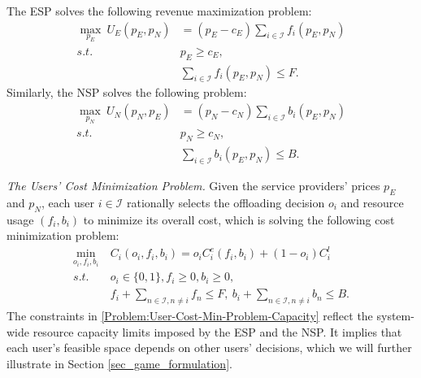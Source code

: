 \documentclass[lettersize,journal]{IEEEtran}
\begin{document}
The ESP solves the following revenue maximization problem:
\begin{subequations}
\label{Problem:ESP}
\begin{align}
    \max_{p_E}\ U_E(p_E,p_N)&=(p_E-c_E)\sum_{i\in\mathcal{I}}f_i(p_E,p_N)\\
    s.t.\ &p_E\ge c_E,\\
    &\sum_{i\in\mathcal{I}}f_i(p_E,p_N)\le F.\label{Problem:ESP-capacity}
\end{align}
\end{subequations}
 Similarly, the NSP solves the following problem:
\begin{subequations}
\label{Problem:NSP}
    \begin{align}
        \max_{p_N}\ U_N(p_N,p_E)&=(p_N-c_N)\sum_{i\in\mathcal{I}}b_i(p_E,p_N)\\
        s.t.\ &p_N\ge c_N,\\
        &\sum_{i\in\mathcal{I}}b_i(p_E,p_N)\le B.\label{Problem:NSP-capacity}
    \end{align}
\end{subequations}


\emph{The Users' Cost Minimization Problem.}
Given the service providers' prices $p_E$ and $p_N$, each user $i\in\mathcal{I}$ rationally selects the offloading decision $o_i$ and resource usage $(f_i,b_i)$ to minimize its overall cost, which is solving the following cost minimization problem:
\begin{subequations}
    \label{Problem:User-Cost-Min-Problem}
    \begin{align}
        \min_{o_i,f_i,b_i}\ &C_i(o_i,f_i,b_i)=o_iC^e_i(f_i,b_i)+(1-o_i)C^l_i\label{Problem:User-Cost-Min-Problem-Target}\\
        s.t.\ &o_i\in\{0,1\},f_i\ge 0, b_i\ge 0,\label{Problem:User-Cost-Min-Problem-Decision}\\
        &f_i+\sum_{n\in\mathcal{I},n\neq i} f_n\le F,\  b_i+\sum_{n\in\mathcal{I},n\neq i}b_n\le B.\label{Problem:User-Cost-Min-Problem-Capacity}
    \end{align}
\end{subequations}
The constraints in \eqref{Problem:User-Cost-Min-Problem-Capacity} reflect the system-wide resource capacity limits imposed by the ESP and the NSP. It implies that each user's feasible space depends on other users' decisions, which we will further illustrate in Section \ref{sec_game_formulation}.
\end{document}
